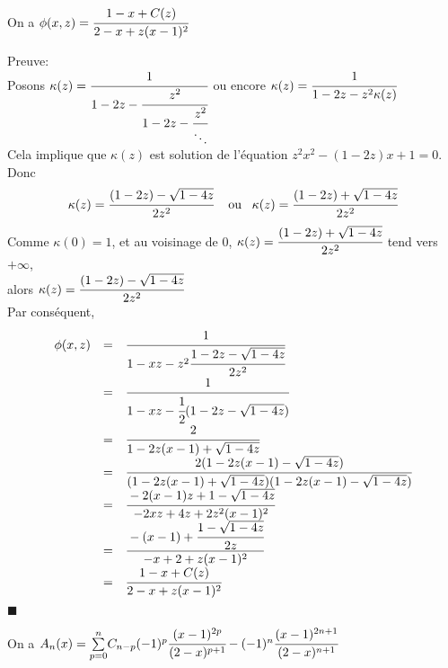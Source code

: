 \begin{corollaire} \label{phiEqCOfT}
	On a $\phi(x,z)=\cfrac{1-x+C(z)}{2-x+z(x-1)^{2}}$
\end{corollaire}
Preuve:\\
Posons $\kappa(z)=\cfrac{1}{1-2z-\cfrac{z^2}{1-2z-\cfrac{z^2}{\ddots}}}$\hspace{5pt}
ou encore $\kappa(z)=\cfrac{1}{1-2z-z^2\kappa(z)}$\vspace{10pt}\\
Cela implique que $\kappa(z)$ est solution de l'équation $z^2x^2-(1-2z)x+1=0$.\vspace{10pt}\\Donc \[
	\kappa(z)=\cfrac{(1-2z)-\sqrt{1-4z}}{2z^2} \text{ \hspace{5pt} ou  \hspace{5pt}} \kappa(z)=\cfrac{(1-2z)+\sqrt{1-4z}}{2z^2}
\]
Comme $\kappa(0)=1$, et au voisinage de 0,  $\kappa(z)=\cfrac{(1-2z)+\sqrt{1-4z}}{2z^2}$ tend vers $+\infty$,\vspace{10pt}\\alors $\kappa(z)=\cfrac{(1-2z)-\sqrt{1-4z}}{2z^2}$\vspace{10pt}\\
Par conséquent,
\[
	\begin{array}{r c l}
		\phi(x,z) & = & \cfrac{1}{1-xz-z^2\cfrac{1-2z-\sqrt{1-4z}}{2z^2}}                                \\
		          & = & \cfrac{1}{1-xz-\cfrac{1}{2}(1-2z-\sqrt{1-4z})}                                   \\
		          & = & \cfrac{2}{1-2z(x-1)+\sqrt{1-4z}}                                                 \\
		          & = & \cfrac{2(1-2z(x-1)-\sqrt{1-4z})}{(1-2z(x-1)+\sqrt{1-4z})(1-2z(x-1)-\sqrt{1-4z})} \\
		          & = & \cfrac{-2(x-1)z+1-\sqrt{1-4z}}{-2xz+4z+2z^2(x-1)^2}                              \\
		          & = & \cfrac{-(x-1)+\cfrac{1-\sqrt{1-4z}}{2z}}{-x+2+z(x-1)^2}                          \\
		          & = & \cfrac{1-x+C(z)}{2-x+z(x-1)^{2}}
	\end{array}
\]
$\blacksquare$
\text{ }
\begin{proposition}
	On a
	$
		A_{n}(x)=\underset{p=0}{\overset{n}{\sum}}C_{n-p}(-1)^p\cfrac{(x-1)^{2p}}{(2-x)^{p+1}}-(-1)^n\cfrac{(x-1)^{2n+1}}{(2-x)^{n+1}}
	$
\end{proposition}
\text{ }\vspace{5pt}\\
